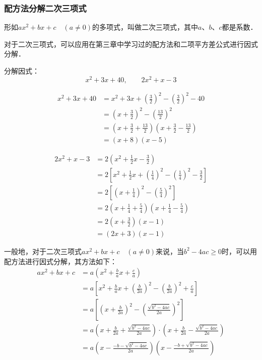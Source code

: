 \subsubsection{配方法分解二次三项式}
形如$ax^2+bx+c\quad (a\ne 0)$的多项式，叫做二次三项式，其中$a$、$b$、$c$都是系数．

对于二次三项式，可以应用在第三章中学习过的配方法和二项平方差公式进行因式分解．
\begin{example}
    分解因式：
\[x^2+3x+40,\qquad 2x^2+x-3\]
\end{example}

\begin{solution}
\[\begin{split}
    x^2+3x+40&=x^2+3x+\left(\frac{3}{2}\right)^2-\left(\frac{3}{2}\right)^2-40\\
    &=\left(x+\frac{3}{2}\right)^2-\left(\frac{13}{2}\right)^2\\
    &=\left(x+\frac{3}{2}+\frac{13}{2}\right)\left(x+\frac{3}{2}-\frac{13}{2}\right)\\
    &=(x+8)(x-5)
\end{split}\]

\[\begin{split}
    2x^2+x-3&=2\left(x^2+\frac{1}{2}x-\frac{3}{2}\right)\\
    &=2\left[x^2+\frac{1}{2}x+\left(\frac{1}{4}\right)^2-\left(\frac{1}{4}\right)^2-\frac{3}{2} \right]\\
    &=2\left[\left(x+\frac{1}{4}\right)^2-\left(\frac{5}{4}\right)^2\right]\\
    &=2\left(x+\frac{1}{4}+\frac{5}{4}\right)
   \left(x+\frac{1}{4}-\frac{5}{4}\right) \\
&=2\left(x+\frac{3}{2}\right)\left(x-1\right)\\
&=(2x+3)(x-1)
\end{split}\]
\end{solution}

一般地，对于二次三项式$ax^2+bx+c\quad (a\ne 0)$来说，当$b^2-4ac\ge 0$时，可以用配方法进行因式分解，其方法如下：
\[\begin{split}
    ax^2+bx+c &=a\left(x^2+\frac{b}{a}x+\frac{c}{a}\right)\\
    &=a\left[x^2+\frac{b}{a}x+\left(\frac{b}{2a}\right)^2-\left(\frac{b}{2a}\right)^2+\frac{c}{a}\right]\\
    &=a\left[\left(x+\frac{b}{2a}\right)^2-\left(\frac{\sqrt{b^2-4ac}}{2a}\right)^2\right]\\
    &=a\left(x+\frac{b}{2a}+\frac{\sqrt{b^2-4ac}}{2a}\right)\cdot \left(x+\frac{b}{2a}-\frac{\sqrt{b^2-4ac}}{2a}\right)\\
    &=a\left(x-\frac{-b-\sqrt{b^2-4ac}}{2a}\right)\left(x-\frac{-b+\sqrt{b^2-4ac}}{2a}\right)
\end{split}\]

